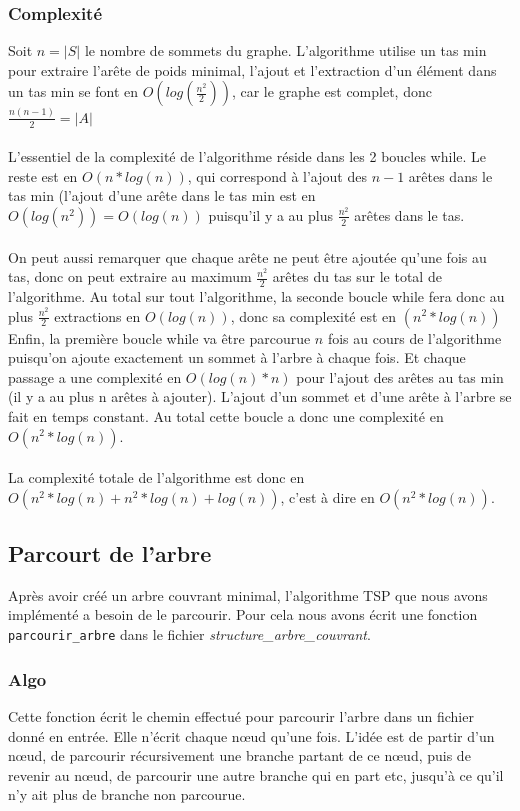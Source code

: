 \documentclass[a4paper,11pt]{article}
\begin{document}
\subsubsection*{Complexité}

Soit $n=|S|$ le nombre de sommets du graphe.
L'algorithme utilise un tas min pour extraire l'arête de poids minimal, l'ajout et l'extraction d'un élément dans un tas min se font en $O(log(\frac{n^2}{2}))$, car le graphe est complet, donc $\frac{n(n-1)}{2} = |A|$\\
\\
L'essentiel de la complexité de l'algorithme réside dans les 2 boucles while. Le reste est en $O(n*log(n))$, qui correspond à l'ajout des $n-1$ arêtes dans le tas min (l'ajout d'une arête dans le tas min est en $O(log(n^2)) = O(log(n))$ puisqu'il y a au plus $\frac{n^2}{2}$ arêtes dans le tas.\\
\\
On peut aussi remarquer que chaque arête ne peut être ajoutée qu'une fois au tas, donc on peut extraire au maximum $\frac{n^2}{2}$ arêtes du tas sur le total de l'algorithme. Au total sur tout l'algorithme, la seconde boucle while fera donc au plus $\frac{n^2}{2}$ extractions en $O(log(n))$, donc sa complexité est en $(n^2*log(n))$\\
Enfin, la première boucle while va être parcourue $n$ fois au cours de l'algorithme puisqu'on ajoute exactement un sommet à l'arbre à chaque fois. Et chaque passage a une complexité en $O(log(n)*n)$ pour l'ajout des arêtes au tas min (il y a au plus n arêtes à ajouter). L'ajout d'un sommet et d'une arête à l'arbre se fait en temps constant. Au total cette boucle a donc une complexité en $O(n^2*log(n))$.\\
\\
La complexité totale de l'algorithme est donc en $O(n^2*log(n)+n^2*log(n)+log(n))$, c'est à dire en $O(n^2*log(n))$.


\subsection{Parcourt de l'arbre} %

Après avoir créé un arbre couvrant minimal, l'algorithme TSP que nous avons implémenté a besoin de le parcourir. Pour cela nous avons écrit une fonction \texttt{parcourir\_arbre} dans le fichier \textit{structure\_arbre\_couvrant}.

\subsubsection*{Algo}
Cette fonction écrit le chemin effectué pour parcourir l'arbre dans un fichier donné en entrée. Elle n'écrit chaque nœud qu'une fois. L'idée est de partir d'un nœud, de parcourir récursivement une branche partant de ce nœud, puis de revenir au nœud, de parcourir une autre branche qui en part etc, jusqu'à ce qu'il n'y ait plus de branche non parcourue.
\end{document}
